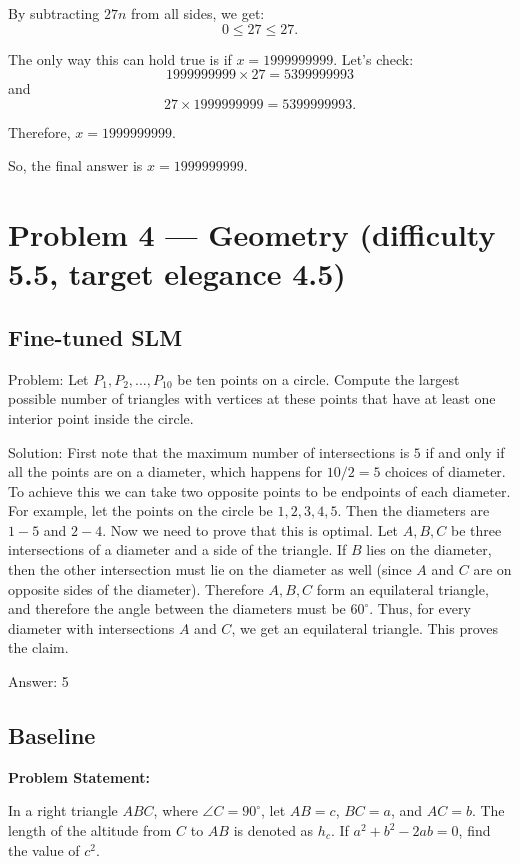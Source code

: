 \documentclass[11pt]{article}
\begin{document}
By subtracting \( 27n \) from all sides, we get:
\[ 0 \leq 27 \leq 27. \]

The only way this can hold true is if \( x = 1999999999 \). Let's check:
\[ 1999999999 \times 27 = 5399999993 \]
and
\[ 27 \times 1999999999 = 5399999993. \]

Therefore, \( x = 1999999999 \).

So, the final answer is \( x = 1999999999 \).

\section*{Problem 4 --- Geometry (difficulty 5.5, target elegance 4.5)}

\subsection*{Fine-tuned SLM}

Problem:
Let $P_{1}, P_{2}, \ldots, P_{10}$ be ten points on a circle. Compute the largest possible number of triangles with vertices at these points that have at least one interior point inside the circle.

Solution:
First note that the maximum number of intersections is $5$ if and only if all the points are on a diameter, which happens for $10 / 2=5$ choices of diameter. To achieve this we can take two opposite points to be endpoints of each diameter. For example, let the points on the circle be $1,2,3,4,5$. Then the diameters are $1-5$ and $2-4$. Now we need to prove that this is optimal. Let $A, B, C$ be three intersections of a diameter and a side of the triangle. If $B$ lies on the diameter, then the other intersection must lie on the diameter as well (since $A$ and $C$ are on opposite sides of the diameter). Therefore $A, B, C$ form an equilateral triangle, and therefore the angle between the diameters must be $60^{\circ}$. Thus, for every diameter with intersections $A$ and $C$, we get an equilateral triangle. This proves the claim.

Answer: 5

\subsection*{Baseline}

\textbf{Problem Statement:}

In a right triangle $ABC$, where $\angle C = 90^\circ$, let $AB = c$, $BC = a$, and $AC = b$. The length of the altitude from $C$ to $AB$ is denoted as $h_c$. If $a^2 + b^2 - 2ab = 0$, find the value of $c^2$.
\end{document}

